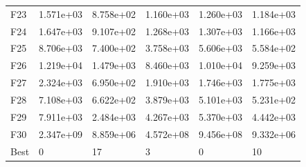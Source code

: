 \begin{tabular}{llllll}
F23  &  1.571e+03 &  8.758e+02 &  1.160e+03 &  1.260e+03 &  1.184e+03 \\
F24  &  1.647e+03 &  9.107e+02 &  1.268e+03 &  1.307e+03 &  1.166e+03 \\
F25  &  8.706e+03 &  7.400e+02 &  3.758e+03 &  5.606e+03 &  5.584e+02 \\
F26  &  1.219e+04 &  1.479e+03 &  8.460e+03 &  1.010e+04 &  9.259e+03 \\
F27  &  2.324e+03 &  6.950e+02 &  1.910e+03 &  1.746e+03 &  1.775e+03 \\
F28  &  7.108e+03 &  6.622e+02 &  3.879e+03 &  5.101e+03 &  5.231e+02 \\
F29  &  7.911e+03 &  2.484e+03 &  4.267e+03 &  5.370e+03 &  4.442e+03 \\
F30  &  2.347e+09 &  8.859e+06 &  4.572e+08 &  9.456e+08 &  9.332e+06 \\
Best &          0 &         17 &          3 &          0 &         10 \\
\bottomrule
\end{tabular}
